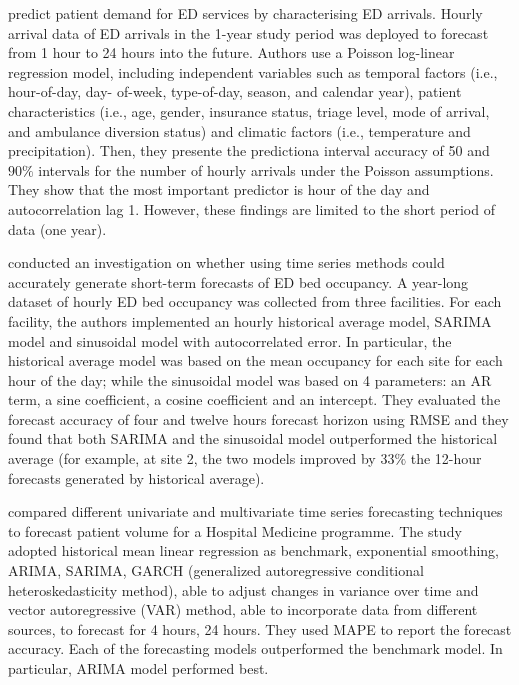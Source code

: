 \documentclass[]{elsarticle} %
\begin{document}
\citet{mccarthy2008challenge} predict patient demand for ED services by characterising ED arrivals. Hourly arrival data of ED arrivals in the 1-year study period was deployed to forecast from 1 hour to 24 hours into the future. Authors use a Poisson log-linear regression model, including independent variables such as temporal factors (i.e., hour-of-day, day- of-week, type-of-day, season, and calendar year), patient characteristics (i.e., age, gender, insurance status, triage level, mode of arrival, and ambulance diversion status) and climatic factors (i.e., temperature and precipitation).
Then, they presente the predictiona interval accuracy of 50 and \(90\%\) intervals for the number of hourly arrivals under the Poisson assumptions. They show that the most important predictor is hour of the day and autocorrelation lag 1. However, these findings are limited to the short period of data (one year).

\citet{schweigler2009forecasting} conducted an investigation on whether using time series methods could accurately generate short-term forecasts of ED bed occupancy.
A year-long dataset of hourly ED bed occupancy was collected from three facilities. For each facility, the authors implemented an hourly historical average model, SARIMA model and sinusoidal model with autocorrelated error. In particular, the historical average model was based on the mean occupancy for each site for each hour of the day; while the sinusoidal model was based on 4 parameters: an AR term, a sine coefficient, a cosine coefficient and an intercept. They evaluated the forecast accuracy of four and twelve hours forecast horizon using RMSE and they found that both SARIMA and the sinusoidal model outperformed the historical average (for example, at site 2, the two models improved by \(33\%\) the 12-hour forecasts generated by historical average).

\citet{kim2014predicting} compared different univariate and multivariate time series forecasting techniques to forecast patient volume for a Hospital Medicine programme.
The study adopted historical mean linear regression as benchmark, exponential smoothing, ARIMA, SARIMA, GARCH (generalized autoregressive conditional heteroskedasticity method), able to adjust changes in variance over time and vector autoregressive (VAR) method, able to incorporate data from different sources, to forecast for 4 hours, 24 hours. They used MAPE to report the forecast accuracy.
Each of the forecasting models outperformed the benchmark model. In particular, ARIMA model performed best.
\end{document}
